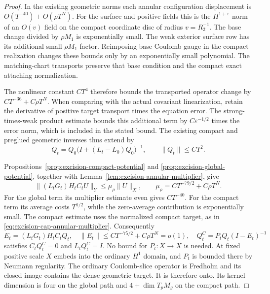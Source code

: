 \documentclass[11pt]{amsart}
\theoremstyle{definition}
\theoremstyle{remark}
\theoremstyle{plain}
\begin{document}
\begin{proof}
In the existing geometric norms each annular configuration
displacement is $O(T^{-40})+O(\rho T^N)$.
For the surface and positive fields this is the
$H^{1+\varepsilon}$ norm of an $O(v)$ field on the compact
coordinate disc of radius $v=R_2^{-1}$.
The base change divided by $\rho M_1$ is exponentially small.
The weak exterior surface row has its additional small
$\rho M_1$ factor. Reimposing base Coulomb gauge in the
compact realization changes these bounds only by an
exponentially small polynomial.
The matching-chart transports preserve that base condition
and the compact exact attaching normalization.

The nonlinear constant $CT^4$ therefore bounds the transported
operator change by $CT^{-36}+C\rho T^N$.
When comparing with the actual covariant linearization, retain
the derivative of positive target transport times the equation
error. The strong-times-weak product estimate bounds this
additional term by $C\varepsilon^{-1/2}$ times the error norm,
which is included in the stated bound.
The existing compact and preglued geometric inverses thus
extend by
\[
             Q_t=Q_0\bigl(I+(L_t-L_0)Q_0\bigr)^{-1},
                          \qquad \|Q_t\|\leq CT^2.
\]

Propositions~\ref{prop:excision-compact-potential} and
\ref{prop:excision-global-potential}, together with
Lemma~\ref{lem:excision-annular-multiplier}, give
\begin{equation}\label{eq:excision-annular-schur-bound}
 \|(L_tG_t)H_tC_tU\|_Y
       \leq \mu_\rho\|U\|_X,\qquad
                  \mu_\rho=CT^{-79/2}+C\rho T^N.
\end{equation}
For the global term its multiplier estimate even gives
$CT^{-40}$. For the compact term its average costs $T^{1/2}$,
while the zero-average contribution is exponentially small.
The compact estimate uses the normalized compact target,
as in \eqref{eq:excision-cap-annular-multiplier}.
Consequently
\[
 E_t=(L_tG_t)H_tC_tQ_t,\quad
 \|E_t\|\leq CT^{-75/2}+C\rho T^N=o(1),\quad
               Q_t^C=P_tQ_t(I-E_t)^{-1}
\]
satisfies $C_tQ_t^C=0$ and $L_tQ_t^C=I$.
No bound for $P_t:X\to X$ is needed.
At fixed positive scale $X$ embeds into the ordinary $H^1$
domain, and $P_t$ is bounded there by Neumann regularity.
The ordinary Coulomb-slice operator is Fredholm and its
closed image contains the dense geometric target. It is
therefore onto. Its kernel dimension is four on the global
path and $4+\dim T_pM_g$ on the compact path.


\end{proof}
\end{document}
